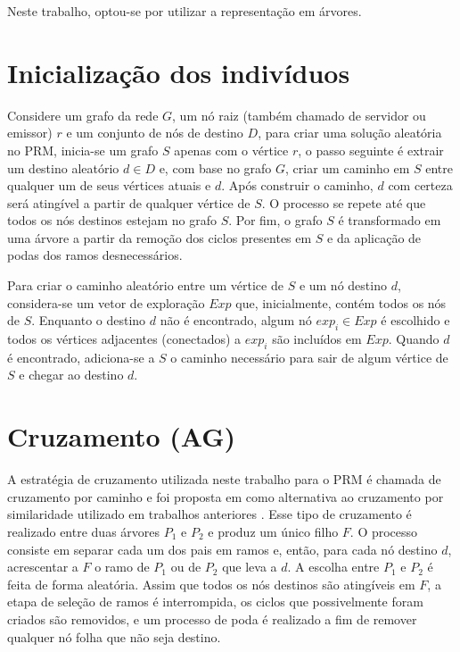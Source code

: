 Neste trabalho, optou-se por utilizar a representação em árvores.

\section{Inicialização dos indivíduos}
Considere um grafo da rede $G$, um nó raiz (também chamado de servidor ou emissor) $r$ e um conjunto de nós de destino $D$, para criar uma solução aleatória no PRM, inicia-se um grafo $S$ apenas com o vértice $r$, o passo seguinte é extrair um destino aleatório $d \in D$ e, com base no grafo $G$, criar um caminho em $S$ entre qualquer um de seus vértices atuais e $d$. Após construir o caminho, $d$ com certeza será atingível a partir de qualquer vértice de $S$. O processo se repete até que todos os nós destinos estejam no grafo $S$. Por fim, o grafo $S$ é transformado em uma árvore a partir da remoção dos ciclos presentes em $S$ e da aplicação de podas dos ramos desnecessários.

Para criar o caminho aleatório entre um vértice de $S$ e um nó destino $d$, considera-se um vetor de exploração $Exp$ que, inicialmente, contém todos os nós de $S$. Enquanto o destino $d$ não é encontrado, algum nó $exp_i \in Exp$ é escolhido e todos os vértices adjacentes (conectados) a $exp_i$ são incluídos em $Exp$. Quando $d$ é encontrado, adiciona-se a $S$ o caminho necessário para sair de algum vértice de $S$ e chegar ao destino $d$.

\section{Cruzamento (AG)}

A estratégia de cruzamento utilizada neste trabalho para o PRM é chamada de cruzamento por caminho e foi proposta em \cite{Lafeta2016} como alternativa ao cruzamento por similaridade utilizado em trabalhos anteriores \cite{Bueno2010}. Esse tipo de cruzamento é realizado entre duas árvores $P_1$ e $P_2$ e produz um único filho $F$. O processo consiste em separar cada um dos pais em ramos e, então, para cada nó destino $d$, acrescentar a $F$ o ramo de $P_1$ ou de $P_2$ que leva a $d$. A escolha entre $P_1$ e $P_2$ é feita de forma aleatória. Assim que todos os nós destinos são atingíveis em $F$, a etapa de seleção de ramos é interrompida, os ciclos que possivelmente foram criados são removidos, e um processo de poda é realizado a fim de remover qualquer nó folha que não seja destino.

